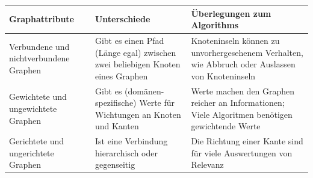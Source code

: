 \documentclass[ngerman,]{scrreprt}
\begin{document}
\begin{longtable}[]{@{}lll@{}}
\toprule
\begin{minipage}[b]{0.14\columnwidth}\raggedright\strut
Graphattribute\strut
\end{minipage} & \begin{minipage}[b]{0.18\columnwidth}\raggedright\strut
Unterschiede\strut
\end{minipage} & \begin{minipage}[b]{0.59\columnwidth}\raggedright\strut
Überlegungen zum Algorithms\strut
\end{minipage}\tabularnewline
\midrule
\endhead
\begin{minipage}[t]{0.14\columnwidth}\raggedright\strut
Verbundene und nichtverbundene Graphen\strut
\end{minipage} & \begin{minipage}[t]{0.18\columnwidth}\raggedright\strut
Gibt es einen Pfad (Länge egal) zwischen zwei beliebigen Knoten eines Graphen\strut
\end{minipage} & \begin{minipage}[t]{0.59\columnwidth}\raggedright\strut
Knoteninseln können zu unvorhergesehenem Verhalten, wie Abbruch oder Auslassen von Knoteninseln\strut
\end{minipage}\tabularnewline
\begin{minipage}[t]{0.14\columnwidth}\raggedright\strut
Gewichtete und ungewichtete Graphen\strut
\end{minipage} & \begin{minipage}[t]{0.18\columnwidth}\raggedright\strut
Gibt es (domänen-spezifische) Werte für Wichtungen an Knoten und Kanten\strut
\end{minipage} & \begin{minipage}[t]{0.59\columnwidth}\raggedright\strut
Werte machen den Graphen reicher an Informationen; Viele Algoritmen benötigen gewichtende Werte\strut
\end{minipage}\tabularnewline
\begin{minipage}[t]{0.14\columnwidth}\raggedright\strut
Gerichtete und ungerichtete Graphen\strut
\end{minipage} & \begin{minipage}[t]{0.18\columnwidth}\raggedright\strut
Ist eine Verbindung hierarchisch oder gegenseitig\strut
\end{minipage} & \begin{minipage}[t]{0.59\columnwidth}\raggedright\strut
Die Richtung einer Kante sind für viele Auswertungen von Relevanz\strut

\end{minipage}
\end{longtable}
\end{document}
